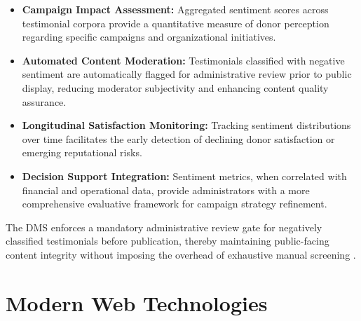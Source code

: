 \documentclass{thesis-library}
\begin{document}
\begin{itemize}
    \item \textbf{Campaign Impact Assessment:} Aggregated sentiment scores across testimonial corpora provide a quantitative measure of donor perception regarding specific campaigns and organizational initiatives.
    \item \textbf{Automated Content Moderation:} Testimonials classified with negative sentiment are automatically flagged for administrative review prior to public display, reducing moderator subjectivity and enhancing content quality assurance.
    \item \textbf{Longitudinal Satisfaction Monitoring:} Tracking sentiment distributions over time facilitates the early detection of declining donor satisfaction or emerging reputational risks.
    \item \textbf{Decision Support Integration:} Sentiment metrics, when correlated with financial and operational data, provide administrators with a more comprehensive evaluative framework for campaign strategy refinement.
\end{itemize}

The DMS enforces a mandatory administrative review gate for negatively classified testimonials before publication, thereby maintaining public-facing content integrity without imposing the overhead of exhaustive manual screening \cite{wang2021enhancing}.

\section{Modern Web Technologies}
\end{document}
